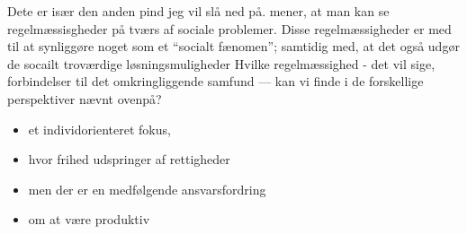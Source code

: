 Dete er især den anden pind jeg vil slå ned på.
\citeauthor{scheurichPolicyArchaeologyNew1994} mener, at man kan se regelmæssisgheder på tværs af sociale problemer.
Disse regelmæssigheder er med til at synliggøre noget som et “socialt fænomen”; samtidig med, at det også udgør de socailt troværdige løsningsmuligheder \cite[s. 301]{scheurichPolicyArchaeologyNew1994}
Hvilke regelmæssighed - det vil sige, forbindelser til det omkringliggende samfund — kan vi finde i de forskellige perspektiver nævnt ovenpå?

\begin{itemize}
  \item
    et individorienteret fokus, 
  \item
    hvor frihed udspringer af rettigheder
  \item
    men der er en medfølgende ansvarsfordring
  \item
    om at være produktiv
\end{itemize}
